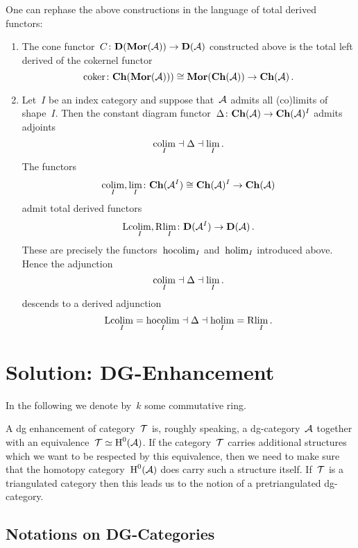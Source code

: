 \documentclass[a4paper,10pt]{scrartcl}
\begin{document}
One can rephase the above constructions in the language of total derived functors:
\begin{enumerate}
  \item
    The cone functor~$C \colon \mathbf{D}(\mathbf{Mor}(\mathcal{A})) \to \mathbf{D}(\mathcal{A})$ constructed above is the total left derived of the cokernel functor
    \[
      \operatorname{coker}
      \colon
      \mathbf{Ch}(\mathbf{Mor}(\mathcal{A})))
      \cong
      \mathbf{Mor}(\mathbf{Ch}(\mathcal{A}))
      \to
      \mathbf{Ch}(\mathcal{A}) \,.
    \]
  \item
    Let~$I$ be an index category and suppose that~$\mathcal{A}$ admits all (co)limits of shape~$I$.
    Then the constant diagram functor~$\Delta \colon \mathbf{Ch}(\mathcal{A}) \to \mathbf{Ch}(\mathcal{A})^I$ admits adjoints
    \[
      {\operatorname*{colim}_I}
      \mathrel{\dashv}
      \Delta
      \mathrel{\dashv}
      {\lim_I} \,.
    \]
    The functors
    \[
      \operatorname*{colim}_I, \lim_I
      \colon
      \mathbf{Ch}(\mathcal{A}^I)
      \cong
      \mathbf{Ch}(\mathcal{A})^I
      \to
      \mathbf{Ch}(\mathcal{A})
    \]
    admit total derived functors
    \[
      \mathrm{L} {\operatorname*{colim}_I},
      \mathrm{R} {\lim_I}
      \colon
      \mathbf{D}(\mathcal{A}^I)
      \to
      \mathbf{D}(\mathcal{A}) \,.
    \]
    These are precisely the functors~$\operatorname*{hocolim}_I$ and~$\operatorname*{holim}_I$ introduced above.
    Hence the adjunction
    \[
      {\operatorname*{colim}_I}
      \mathrel{\dashv}
      \Delta
      \mathrel{\dashv}
      {\lim_I} \,.
    \]
    descends to a derived adjunction
    \[
      \mathrm{L} {\operatorname*{colim}_I}
      =
      \operatorname*{hocolim}_I
      \mathrel{\dashv}
      \Delta
      \mathrel{\dashv}
      \operatorname*{holim}_I
      =
      \mathrm{R} {\lim_I} \,.
    \]
\end{enumerate}





\section{Solution: DG-Enhancement}

In the following we denote by~$k$ some commutative ring.

A dg enhancement of category~$\mathcal{T}$ is, roughly speaking, a dg-category~$\mathcal{A}$ together with an equivalence~$\mathcal{T} \simeq \operatorname{H}^0(\mathcal{A})$.
If the category~$\mathcal{T}$ carries additional structures which we want to be respected by this equivalence, then we need to make sure that the homotopy category~$\operatorname{H}^0(\mathcal{A})$ does carry such a structure itself.
If~$\mathcal{T}$ is a triangulated category then this leads us to the notion of a pretriangulated dg-category.



\subsection{Notations on DG-Categories}
\end{document}
